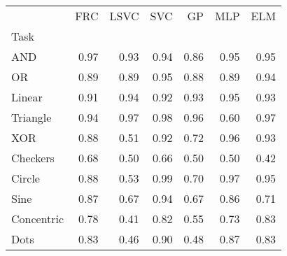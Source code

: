 \begin{tabular}{lrrrrrr}
\toprule
 & FRC & LSVC & SVC & GP & MLP & ELM \\
Task &  &  &  &  &  &  \\
\midrule
AND & 0.97 & 0.93 & 0.94 & 0.86 & 0.95 & 0.95 \\
OR & 0.89 & 0.89 & 0.95 & 0.88 & 0.89 & 0.94 \\
Linear & 0.91 & 0.94 & 0.92 & 0.93 & 0.95 & 0.93 \\
Triangle & 0.94 & 0.97 & 0.98 & 0.96 & 0.60 & 0.97 \\
XOR & 0.88 & 0.51 & 0.92 & 0.72 & 0.96 & 0.93 \\
Checkers & 0.68 & 0.50 & 0.66 & 0.50 & 0.50 & 0.42 \\
Circle & 0.88 & 0.53 & 0.99 & 0.70 & 0.97 & 0.95 \\
Sine & 0.87 & 0.67 & 0.94 & 0.67 & 0.86 & 0.71 \\
Concentric & 0.78 & 0.41 & 0.82 & 0.55 & 0.73 & 0.83 \\
Dots & 0.83 & 0.46 & 0.90 & 0.48 & 0.87 & 0.83 \\
\bottomrule
\end{tabular}
